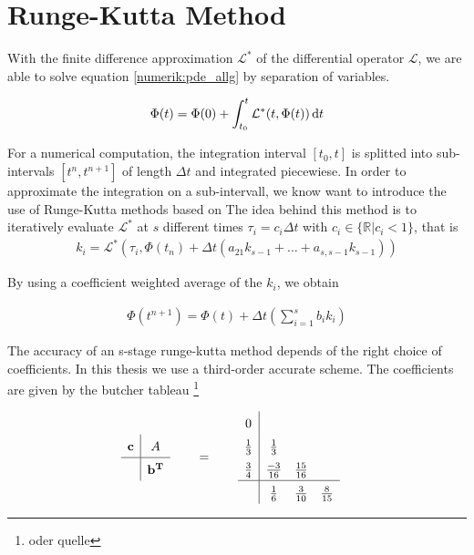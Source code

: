 \newpage

\section{Runge-Kutta Method}

With the finite difference approximation $\mathcal{L^*}$ of the differential operator $\mathcal{L}$,
we are able to solve equation \ref{numerik:pde_allg} by separation of variables.

\begin{align}
    \Phi(t) = \Phi(0) + \int_{t_0}^{t} \mathcal{L^*} (t, \Phi(t)) \mathop{}\!\mathrm{d} t
\end{align}

For a numerical computation, the integration interval $[t_0, t]$  is splitted into sub-intervals $[t^n, t^{n+1}]$ of length $\Delta t$ and integrated piecewiese.
In order to approximate the integration on a sub-intervall, we know want to introduce the use of Runge-Kutta methods based on \citep{Sarbach2012}
The idea behind this method is to iteratively evaluate $\mathcal{L^*}$ at $s$ different times $\tau_i=c_i \Delta t$ with $c_i \in \{\mathbb{R} | c_i<1  \}$,
that is
\begin{align}
 k_i = \mathcal{L^*} \left(\tau_i, \Phi(t_n) + \Delta t \left(a_{21} k_{s-1} + \dots + a_{s, s-1} k_{s-1} \right)\right)
\end{align}

By using a coefficient weighted average of the $k_i$, we obtain

\begin{align}
    \Phi(t^{n+1}) = \Phi(t) + \Delta t \left( \sum_{i=1}^s b_i k_i \right)
\end{align}

The accuracy of an s-stage runge-kutta method depends of the right choice of coefficients.
In this thesis we use a third-order accurate scheme.
The coefficients are given by the butcher tableau \citep{QUELLE}
\footnote{oder quelle}

\begin{align}
    \label{num:butcher}
    \def\arraystretch{1.5}%
    \begin{array}{c|c}
        \mathbf{c} & A\\
        \hline     & \mathbf{b^T} \\
    \end{array}
    \qquad &= \qquad
    \def\arraystretch{1.5}%
    \begin{array}{c|ccc}
            0 \\
                    \frac{1}{3} & \frac{1}{3} \\
            \frac{3}{4} & \frac{-3}{16} & \frac{15}{16} \\
            \hline & \frac{1}{6} & \frac{3}{10} & \frac{8}{15}
    \end{array}
\end{align}

